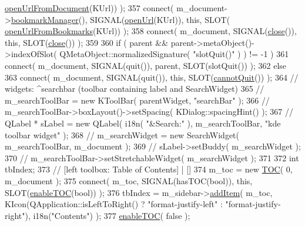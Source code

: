 \begin{DoxyCode}
{      \hyperlink{classOkular_1_1Part_a95dad8c98085c2a00d68864bb967140d}{openUrlFromDocument}(KUrl)) );
357     connect( m\_document->\hyperlink{classOkular_1_1Document_a2a2a1f0f5384563c8b24c2ba48809839}{bookmarkManager}(), SIGNAL(\hyperlink{classOkular_1_1Part_af2a25b12165df885a959622966c2a852}{openUrl}(KUrl)), \textcolor{keyword}{this}, SLOT(
      \hyperlink{classOkular_1_1Part_acee955a7465dfe165af05438ba879688}{openUrlFromBookmarks}(KUrl)) );
358     connect( m\_document, SIGNAL(\hyperlink{classOkular_1_1Part_a3f783ea1df40dc11e725fd15e5fb0af2}{close}()), \textcolor{keyword}{this}, SLOT(\hyperlink{classOkular_1_1Part_a3f783ea1df40dc11e725fd15e5fb0af2}{close}()) );
359 
360     \textcolor{keywordflow}{if} ( parent && parent->metaObject()->indexOfSlot( QMetaObject::normalizedSignature( \textcolor{stringliteral}{"slotQuit()"} ) ) !=
       -1 )
361         connect( m\_document, SIGNAL(quit()), parent, SLOT(slotQuit()) );
362     \textcolor{keywordflow}{else}
363         connect( m\_document, SIGNAL(quit()), \textcolor{keyword}{this}, SLOT(\hyperlink{classOkular_1_1Part_a4f6f80955d2ea94344fdc7baa1332a29}{cannotQuit}()) );
364     \textcolor{comment}{// widgets: ^searchbar (toolbar containing label and SearchWidget)}
365     \textcolor{comment}{//      m\_searchToolBar = new KToolBar( parentWidget, "searchBar" );}
366     \textcolor{comment}{//      m\_searchToolBar->boxLayout()->setSpacing( KDialog::spacingHint() );}
367     \textcolor{comment}{//      QLabel * sLabel = new QLabel( i18n( "&Search:" ), m\_searchToolBar, "kde toolbar widget" );}
368     \textcolor{comment}{//      m\_searchWidget = new SearchWidget( m\_searchToolBar, m\_document );}
369     \textcolor{comment}{//      sLabel->setBuddy( m\_searchWidget );}
370     \textcolor{comment}{//      m\_searchToolBar->setStretchableWidget( m\_searchWidget );}
371 
372     \textcolor{keywordtype}{int} tbIndex;
373     \textcolor{comment}{// [left toolbox: Table of Contents] | []}
374     m\_toc = \textcolor{keyword}{new} \hyperlink{classTOC}{TOC}( 0, m\_document );
375     connect( m\_toc, SIGNAL(hasTOC(\textcolor{keywordtype}{bool})), \textcolor{keyword}{this}, SLOT(\hyperlink{classOkular_1_1Part_a4b428bf81d55d103fab30b3561a86feb}{enableTOC}(\textcolor{keywordtype}{bool})) );
376     tbIndex = m\_sidebar->\hyperlink{classSidebar_a642911afe1e9edd9d758df420a12a03d}{addItem}( m\_toc, KIcon(QApplication::isLeftToRight() ? \textcolor{stringliteral}{"format-justify-left"}
       : \textcolor{stringliteral}{"format-justify-right"}), i18n(\textcolor{stringliteral}{"Contents"}) );
377     \hyperlink{classOkular_1_1Part_a4b428bf81d55d103fab30b3561a86feb}{enableTOC}( \textcolor{keyword}{false} );
}
\end{DoxyCode}
